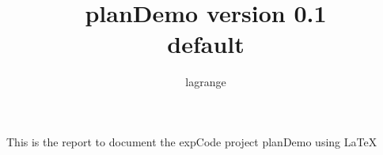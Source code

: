 \documentclass[10pt,a4paper,fleqn]{article}
\title{planDemo version 0.1\\ default}
\author{ lagrange }
\begin{document}
 
  
\maketitle 
  
  
This is the report to document the expCode project planDemo using \LaTeX 
  
  
  
% 
% 
  
\end{document}
